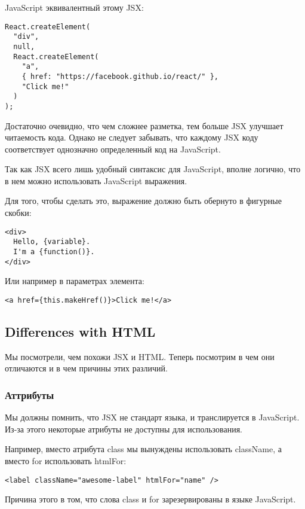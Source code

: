 \documentclass[12pt]{book}
\begin{document}
JavaScript эквивалентный этому JSX:

\begin{lstlisting}
React.createElement(
  "div",
  null,
  React.createElement(
    "a",
    { href: "https://facebook.github.io/react/" },
    "Click me!"
  ) 
);
\end{lstlisting}

Достаточно очевидно, что чем сложнее разметка, тем больше JSX улучшает читаемость кода. Однако не следует забывать, что каждому JSX коду соответствует однозначно определенный код на JavaScript.

Так как JSX всего лишь удобный синтаксис для JavaScript, вполне логично, что в нем можно использовать JavaScript выражения. 

Для того, чтобы сделать это, выражение должно быть обернуто в фигурные скобки:

\begin{lstlisting}
<div>
  Hello, {variable}.
  I'm a {function()}.
</div>	
\end{lstlisting}


Или например в параметрах элемента:

\begin{lstlisting}
<a href={this.makeHref()}>Click me!</a>
\end{lstlisting}

\subsection*{Differences with HTML}

Мы посмотрели, чем похожи JSX и HTML. Теперь посмотрим в чем они отличаются и в чем причины этих различий.

\subsubsection*{Аттрибуты}

Мы должны помнить, что JSX не стандарт языка, и транслируется в JavaScript. Из-за этого некоторые атрибуты не доступны для использования.

Например, вместо атрибута class мы вынуждены использовать className, а вместо for использовать htmlFor:

\begin{lstlisting}
<label className="awesome-label" htmlFor="name" />
\end{lstlisting}

Причина этого в том, что слова class и for зарезервированы в языке JavaScript.
\end{document}
